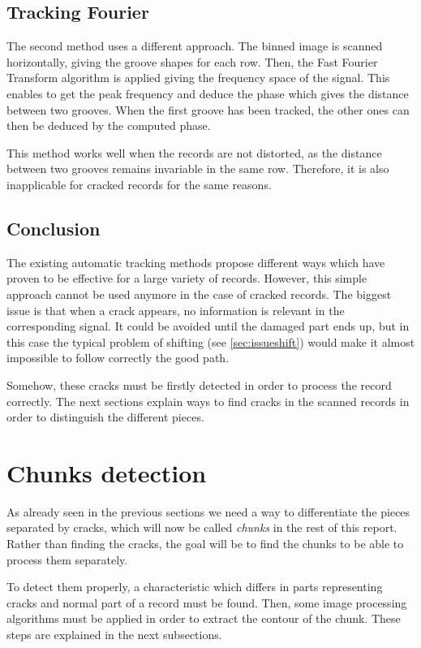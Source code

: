 \subsection{Tracking Fourier}

The second method uses a different approach. The binned image is scanned horizontally, giving the groove shapes for each row. Then, the Fast Fourier Transform algorithm is applied giving the frequency space of the signal. This enables to get the peak frequency and deduce the phase which gives the distance between two grooves. When the first groove has been tracked, the other ones can then be deduced by the computed phase.

This method works well when the records are not distorted, as the distance between two grooves remains invariable in the same row. Therefore, it is also inapplicable for cracked records for the same reasons.

\subsection{Conclusion}

The existing automatic tracking methods propose different ways which have proven to be effective for a large variety of records. However, this simple approach cannot be used anymore in the case of cracked records. The biggest issue is that when a crack appears, no information is relevant in the corresponding signal. It could be avoided until the damaged part ends up, but in this case the typical problem of shifting (see \autoref{sec:issueshift}) would make it almost impossible to follow correctly the good path.

Somehow, these cracks must be firstly detected in order to process the record correctly. The next sections explain ways to find cracks in the scanned records in order to distinguish the different pieces.

\section{Chunks detection}

As already seen in the previous sections we need a way to differentiate the pieces separated by cracks, which will now be called \emph{chunks} in the rest of this report. Rather than finding the cracks, the goal will be to find the chunks to be able to process them separately.

To detect them properly, a characteristic which differs in parts representing cracks and normal part of a record must be found. Then, some image processing algorithms must be applied in order to extract the contour of the chunk. These steps are explained in the next subsections.

